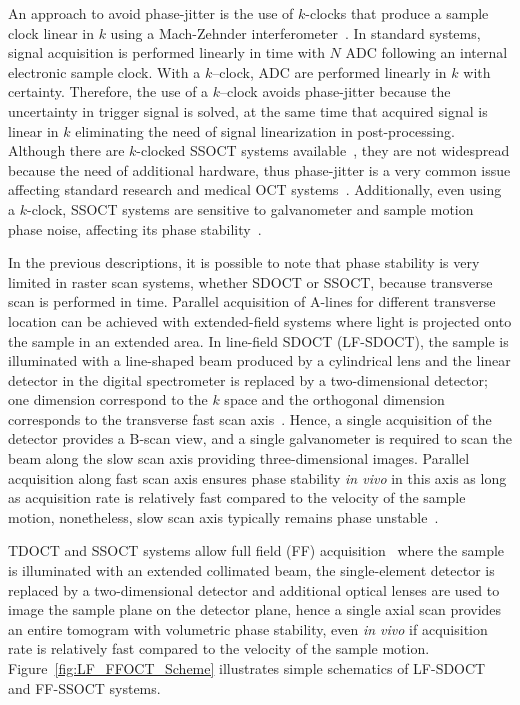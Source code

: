 An approach to avoid phase-jitter is the use of $k$-clocks that produce a sample clock linear in $k$ using a Mach-Zehnder interferometer~\cite{Johnson_Multispeed}. In standard systems, signal acquisition is performed linearly in time with $N$ ADC following an internal electronic sample clock. With a $k$--clock, ADC are performed linearly in $k$ with certainty. Therefore, the use of a $k$--clock avoids phase-jitter because the uncertainty in trigger signal is solved, at the same time that acquired signal is linear in $k$ eliminating the need of signal linearization in post-processing. Although there are $k$-clocked SSOCT systems available~\cite{Kumar2017_Invivo}, they are not widespread because the need of additional hardware, thus phase-jitter is a very common issue affecting standard research and medical OCT systems~\cite{Bouma2015_Optical}. Additionally, even using a $k$-clock, SSOCT systems are sensitive to galvanometer and sample motion phase noise, affecting its phase stability~\cite{Shemonski2014_Stability-1}.

In the previous descriptions, it is possible to note that phase stability is very limited in raster scan systems, whether SDOCT or SSOCT, because transverse scan is performed in time. Parallel acquisition of A-lines for different transverse location can be achieved with extended-field systems where light is projected onto the sample in an extended area. In line-field SDOCT (LF-SDOCT), the sample is illuminated with a line-shaped beam produced by a cylindrical lens and the linear detector in the digital spectrometer is replaced by a two-dimensional detector; one dimension correspond to the $k$ space and the orthogonal dimension corresponds to the transverse fast scan axis~\cite{Nakamura2007_Highspeed, Ginner2017_Noniterative}. Hence, a single acquisition of the detector provides a B-scan view, and a single galvanometer is required to scan the beam along the slow scan axis providing three-dimensional images. Parallel acquisition along fast scan axis ensures phase stability \textit{in vivo} in this axis as long as acquisition rate is relatively fast compared to the velocity of the sample motion, nonetheless, slow scan axis typically remains phase unstable~\cite{Ginner2017_Noniterative}.

TDOCT and SSOCT systems allow full field (FF) acquisition~\cite{Dubois2002_Highresolution, Hillmann2016_Aberrationfree} where the sample is illuminated with an extended collimated beam, the single-element detector is replaced by a two-dimensional detector and additional optical lenses are used to image the sample plane on the detector plane, hence a single axial scan provides an entire tomogram with volumetric phase stability, even \textit{in vivo} if acquisition rate is relatively fast compared to the velocity of the sample motion. Figure~\ref{fig:LF_FFOCT_Scheme} illustrates simple schematics of LF-SDOCT and FF-SSOCT systems.

